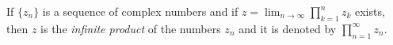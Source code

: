 If $\{z_n\}$ is a sequence of complex numbers and if $z = \lim_{n \to \infty} \prod_{k=1}^{n} z_k$ exists, then $z$ is the \textit{infinite product} of the numbers $z_n$ and it is denoted by $\prod_{n=1}^{\infty} z_n$.
